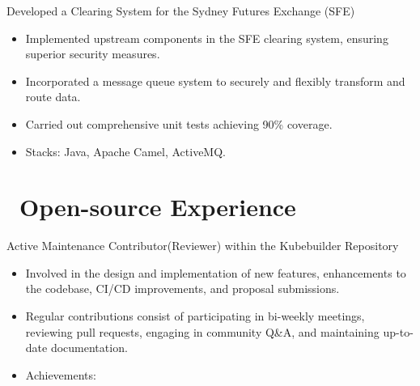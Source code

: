 \documentclass{resume}
\begin{document}
Developed a Clearing System for the Sydney Futures Exchange (SFE)
\begin{itemize}
  \item Implemented upstream components in the SFE clearing system, ensuring superior security measures.
  \item Incorporated a message queue system to securely and flexibly transform and route data.
  \item Carried out comprehensive unit tests achieving 90\% coverage.
  \item Stacks: Java, Apache Camel, ActiveMQ.
\end{itemize}

\section{\faUsers\ Open-source Experience}

Active Maintenance Contributor(Reviewer) within the Kubebuilder Repository
\begin{itemize}
  \item Involved in the design and implementation of new features, enhancements to the codebase, CI/CD improvements, and proposal submissions.
  \item Regular contributions consist of participating in bi-weekly meetings, reviewing pull requests, engaging in community Q\&A, and maintaining up-to-date documentation.
  \item Achievements:
     \textperiodcentered\
     \textperiodcentered\
     \textperiodcentered\
\end{itemize}

\end{document}

